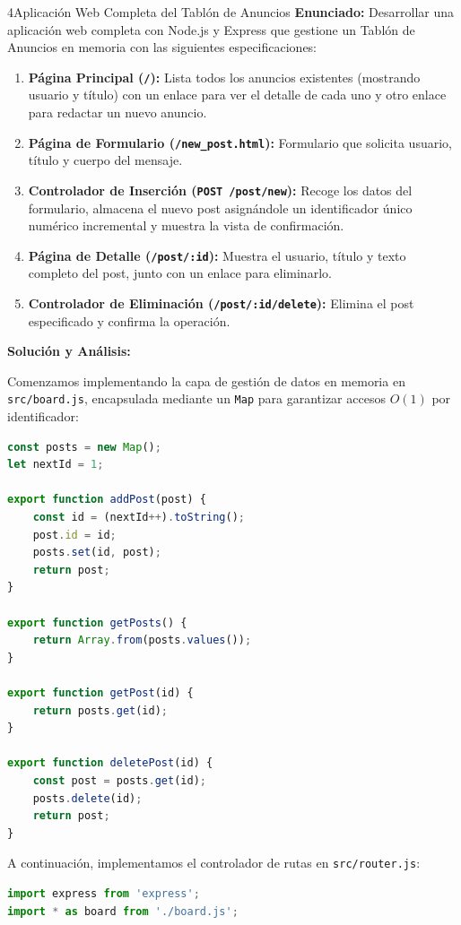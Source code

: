 \begin{ejercicioresuelto}{4}{Aplicación Web Completa del Tablón de Anuncios}
\textbf{Enunciado:} Desarrollar una aplicación web completa con Node.js y Express que gestione un Tablón de Anuncios en memoria con las siguientes especificaciones:
\begin{enumerate}
    \item \textbf{Página Principal (\texttt{/}):} Lista todos los anuncios existentes (mostrando usuario y título) con un enlace para ver el detalle de cada uno y otro enlace para redactar un nuevo anuncio.
    \item \textbf{Página de Formulario (\texttt{/new\_post.html}):} Formulario que solicita usuario, título y cuerpo del mensaje.
    \item \textbf{Controlador de Inserción (\texttt{POST /post/new}):} Recoge los datos del formulario, almacena el nuevo post asignándole un identificador único numérico incremental y muestra la vista de confirmación.
    \item \textbf{Página de Detalle (\texttt{/post/:id}):} Muestra el usuario, título y texto completo del post, junto con un enlace para eliminarlo.
    \item \textbf{Controlador de Eliminación (\texttt{/post/:id/delete}):} Elimina el post especificado y confirma la operación.
\end{enumerate}

\textbf{Solución y Análisis:}

Comenzamos implementando la capa de gestión de datos en memoria en \texttt{src/board.js}, encapsulada mediante un \texttt{Map} para garantizar accesos $O(1)$ por identificador:
\begin{lstlisting}[language=javascript, caption={src/board.js: Gestión de anuncios en memoria}]
const posts = new Map();
let nextId = 1;

export function addPost(post) {
    const id = (nextId++).toString();
    post.id = id;
    posts.set(id, post);
    return post;
}

export function getPosts() {
    return Array.from(posts.values());
}

export function getPost(id) {
    return posts.get(id);
}

export function deletePost(id) {
    const post = posts.get(id);
    posts.delete(id);
    return post;
}
\end{lstlisting}

A continuación, implementamos el controlador de rutas en \texttt{src/router.js}:
\begin{lstlisting}[language=javascript, caption={src/router.js: Enrutamiento del tablón de anuncios}]
import express from 'express';
import * as board from './board.js';


\end{lstlisting}
\end{ejercicioresuelto}
